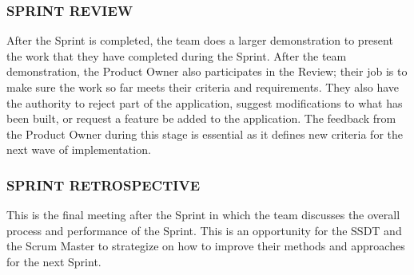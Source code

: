 \subsubsection{SPRINT REVIEW}
After the Sprint is completed, the team does a larger demonstration to present the work that they have completed during the Sprint. After the team demonstration, the Product Owner also participates in the Review; their job is to make sure the work so far meets their criteria and requirements. They also have the authority to reject part of the application, suggest modifications to what has been built, or request a feature be added to the application. The feedback from the Product Owner during this stage is essential as it defines new criteria for the next wave of implementation.

\subsubsection{SPRINT RETROSPECTIVE}
This is the final meeting after the Sprint in which the team discusses the overall process and performance of the Sprint. This is an opportunity for the SSDT and the Scrum Master to strategize on how to improve their methods and approaches for the next Sprint.
